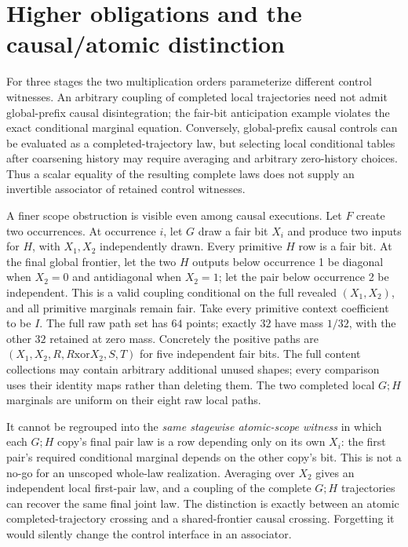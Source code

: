 \documentclass[11pt]{article}
\begin{document}
\section{Higher obligations and the causal/atomic distinction}
For three stages the two multiplication orders parameterize different control witnesses. An arbitrary coupling of completed local trajectories need not admit global-prefix causal disintegration; the fair-bit anticipation example violates the exact conditional marginal equation. Conversely, global-prefix causal controls can be evaluated as a completed-trajectory law, but selecting local conditional tables after coarsening history may require averaging and arbitrary zero-history choices. Thus a scalar equality of the resulting complete laws does not supply an invertible associator of retained control witnesses.

A finer scope obstruction is visible even among causal executions. Let $F$ create two occurrences. At occurrence $i$, let $G$ draw a fair bit $X_i$ and produce two inputs for $H$, with $X_1,X_2$ independently drawn. Every primitive $H$ row is a fair bit. At the final global frontier, let the two $H$ outputs below occurrence 1 be diagonal when $X_2=0$ and antidiagonal when $X_2=1$; let the pair below occurrence 2 be independent. This is a valid coupling conditional on the full revealed $(X_1,X_2)$, and all primitive marginals remain fair. Take every primitive context coefficient to be $I$. The full raw path set has $64$ points; exactly $32$ have mass $1/32$, with the other $32$ retained at zero mass. Concretely the positive paths are $(X_1,X_2,R,R\mathbin{\mathrm{xor}}X_2,S,T)$ for five independent fair bits. The full content collections may contain arbitrary additional unused shapes; every comparison uses their identity maps rather than deleting them. The two completed local $G;H$ marginals are uniform on their eight raw local paths.

It cannot be regrouped into the \emph{same stagewise atomic-scope witness} in which each $G;H$ copy's final pair law is a row depending only on its own $X_i$: the first pair's required conditional marginal depends on the other copy's bit. This is not a no-go for an unscoped whole-law realization. Averaging over $X_2$ gives an independent local first-pair law, and a coupling of the complete $G;H$ trajectories can recover the same final joint law. The distinction is exactly between an atomic completed-trajectory crossing and a shared-frontier causal crossing. Forgetting it would silently change the control interface in an associator.
\end{document}
